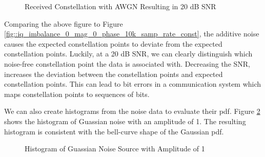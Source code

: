 \documentclass{article}
\begin{document}
\begin{figure}[H]
	\centerline{}
	\caption{Received Constellation with AWGN Resulting in 20 dB SNR}
	\label{fig::noise_constellation_20dB_snr}
\end{figure}

Comparing the above figure to Figure \ref{fig::iq_imbalance_0_mag_0_phase_10k_samp_rate_const}, the additive noise causes the expected constellation points to deviate from the expected constellation points. Luckily, at a 20 dB SNR, we can clearly distinguish which noise-free constellation point the data is associated with. Decreasing the SNR, increases the deviation between the constellation points and expected constellation points. This can lead to bit errors in a communication system which maps constellation points to sequences of bits.

We can also create histograms from the noise data to evaluate their pdf. Figure \ref{fig::gaussian_noise_histogram} shows the histogram of Guassian noise with an amplitude of 1. The resulting histogram is consistent with the bell-curve shape of the Gaussian pdf.

\begin{figure}[H]
	\centerline{}
	\caption{Histogram of Guassian Noise Source with Amplitude of 1}
	\label{fig::gaussian_noise_histogram}
\end{figure}
\end{document}
